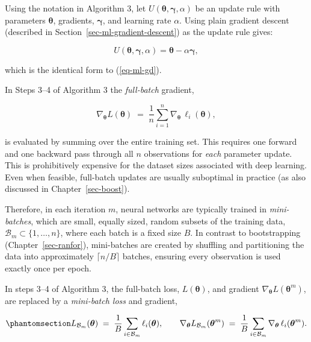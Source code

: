 \documentclass[
  letterpaper,
  krantz2]{style/krantz}
\begin{document}
Using the notation in Algorithm 3, let
\(U(\boldsymbol{\theta}, \boldsymbol{\gamma}, \alpha)\) be an update
rule with parameters \(\boldsymbol{\theta}\), gradients,
\(\boldsymbol{\gamma}\), and learning rate
\(\alpha\). Using plain gradient descent
(described in Section~\ref{sec-ml-gradient-descent}) as the update rule
gives:

\[
U(\boldsymbol{\theta}, \boldsymbol{\gamma}, \alpha) = \boldsymbol{\theta}- \alpha\boldsymbol{\gamma},
\]

which is the identical form to (\ref{eq-ml-gd}).

In Steps 3--4 of Algorithm 3 the \emph{full-batch} gradient,

\[
\nabla_{\boldsymbol{\theta}} L(\boldsymbol{\theta}) \;=\; \frac{1}{n}\sum_{i=1}^{n} \nabla_{\boldsymbol{\theta}}\,\ell_i(\boldsymbol{\theta}),
\]

is evaluated by summing over the entire training set. This requires one
forward and one backward pass through all \(n\) observations for
\emph{each} parameter update. This is prohibitively expensive for the
dataset sizes associated with deep learning. Even when feasible,
full-batch updates are usually suboptimal in practice (as also discussed
in Chapter~\ref{sec-boost}).

Therefore, in each iteration \(m\), neural networks are typically
trained in \emph{mini-batches}, which are small, equally sized, random
subsets of the training data,
\(\mathcal{B}_m \subset \{1, \ldots, n\}\), where each batch is a fixed
size \(B\). In
contrast to bootstrapping (Chapter~\ref{sec-ranfor}), mini-batches are
created by shuffling and partitioning the data into approximately
\(\lceil n / B \rceil\) batches, ensuring every observation is used
exactly once per
epoch.

In steps 3--4 of Algorithm 3, the full-batch loss,
\(L(\boldsymbol{\theta})\), and gradient
\(\nabla_{\boldsymbol{\theta}} L(\boldsymbol{\theta}^{m})\), are
replaced by a \emph{mini-batch loss} and gradient,

\begin{equation}\phantomsection\label{eq-nnet-minibatch}{
L_{\mathcal{B}_m}(\boldsymbol{\theta}) \;=\; \frac{1}{B}\sum_{i \in \mathcal{B}_m} \ell_i(\boldsymbol{\theta}),
\qquad
\nabla_{\boldsymbol{\theta}} L_{\mathcal{B}_m}(\boldsymbol{\theta}^{m}) \;=\; \frac{1}{B}\sum_{i \in \mathcal{B}_m}\nabla_{\boldsymbol{\theta}}\,\ell_i(\boldsymbol{\theta}^{m}).
}\end{equation}
\end{document}
